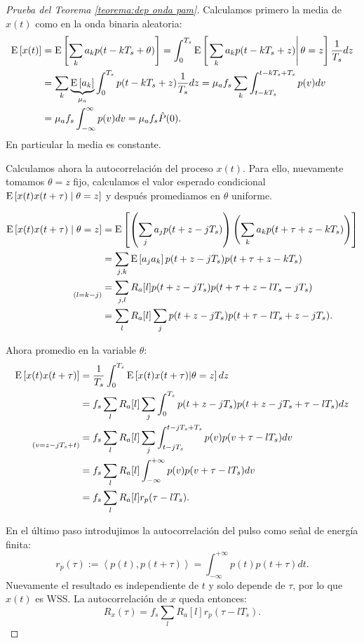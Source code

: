 \begin{proof}[Prueba del Teorema \ref{teorema:dep onda pam}]

    Calculamos primero la media de $x(t)$ como en la onda binaria aleatoria:
    \begin{align*}
        \mathrm{E}\left[x(t)\right] &= \mathrm{E}\left[\sum_k a_k p(t-kT_s + \theta)\right] = \int_0^{T_s} \mathrm{E}\left[\left.\sum_k a_k p(t-kT_s + z)\right| \theta=z\right] \frac{1}{T_s}dz \\
        &= \sum_{k} \underbrace{\mathrm{E}\left[a_k\right]}_{\mu_a} \int_0^{T_s} p(t-kT_s+z) \frac{1}{T_s} dz = \mu_a f_s \sum_k \int_{t-kT_s}^{t-kT_s+T_s}p(v) dv \\
        &= \mu_a f_s \int_{-\infty}^\infty p(v)dv = \mu_a f_s \hat{P}(0).
    \end{align*}
    En particular la media es constante.
    
    Calculamos ahora la autocorrelación del proceso $x(t)$. Para ello, nuevamente tomamos $\theta=z$ fijo, calculamos el valor esperado condicional $\mathrm{E}\left[x(t) x(t+\tau)\mid\theta = z\right]$ y después promediamos en $\theta$ uniforme.

    \begin{align*}
    \mathrm{E}\left[x(t)x(t+\tau)\mid \theta=z\right]  & = \mathrm{E}\left[\left(\sum_j a_j p(t+z-jT_s)\right) \left(\sum_k a_k p(t+\tau+z-kT_s)\right)\right]\\
        & = \sum_{j,k} \mathrm{E}\left[a_j a_k\right] p(t+z - jT_s) p(t+\tau+z-kT_s)\\
        \underset{\scriptstyle(l=k-j)}{} & =  \sum_{j,l} R_a[l] p(t+z-jT_s) p(t+\tau+z-lT_s-jT_s)\\
        & = \sum_l R_a[l] \sum_j p(t+z-jT_s)p(t+\tau-lT_s+z-jT_s).
\end{align*}

Ahora promedio en la variable $\theta$:
\begin{align*}
    \mathrm{E}\left[x(t)x(t+\tau)\right] & = \frac{1}{T_s}\int_0^{T_s} \mathrm{E}\left[x(t)x(t+\tau)|\theta=z\right] dz  \\
    & = f_s \sum_l R_a[l] \sum_j\int_0^{T_s} p(t+z-jT_s) p(t+z-jT_s + \tau-lT_s) dz \\
    \underset{\scriptstyle(v=z-jT_s+t)}{} & = f_s  \sum_l R_a[l] \sum_j \int_{t-jT_s}^{t-jT_s+T_s} p(v) p(v + \tau - lT_s) dv \\
    & = f_s \sum_l R_a[l] \int_{-\infty}^{+\infty} p(v) p(v + \tau-lT_s)dv \\
    & = f_s \sum_l R_a[l] r_p(\tau-lT_s).
\end{align*}

En el último paso introdujimos la autocorrelación del pulso como señal de energía finita:
\begin{equation*}
r_p(\tau) := \left\langle p(t),p(t+\tau)\right\rangle = \int_{-\infty}^{+\infty} p(t) p(t + \tau)dt.    
\end{equation*}
Nuevamente el resultado es independiente de $t$ y solo depende de $\tau$, por lo que $x(t)$ es WSS. La autocorrelación de $x$ queda entonces:
\begin{equation}\label{eq:autocorr onda pam}
    R_x (\tau) = f_s \sum_l R_a[l] r_p(\tau-lT_s).
\end{equation}


\end{proof}
